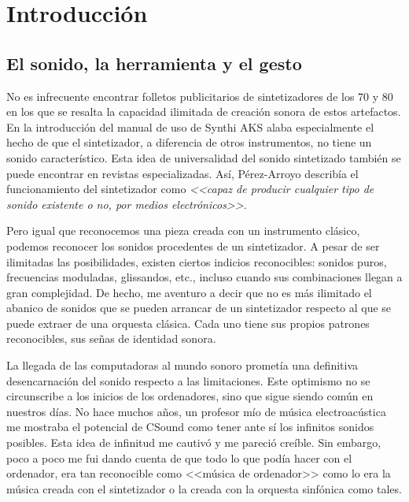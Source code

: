 \chapter[Introducción]{Introducción}


\section{El sonido, la herramienta y el gesto}


No es infrecuente encontrar folletos publicitarios de sintetizadores de los 70 y 80 en los que se resalta la capacidad ilimitada de creación sonora de estos artefactos. En la introducción del manual de uso de Synthi AKS \cite{SynthiAKS_brochure} alaba especialmente el hecho de que el sintetizador, a diferencia de otros instrumentos, no tiene un sonido característico. Esta idea de universalidad del sonido sintetizado también se puede encontrar en revistas especializadas. Así, Pérez-Arroyo describía el funcionamiento del sintetizador como \textit{<<capaz de producir cualquier tipo de sonido existente o no, por medios electrónicos>>}\cite{ritmo_542}. 

Pero igual que reconocemos una pieza creada con un instrumento clásico, podemos reconocer los sonidos procedentes de un sintetizador. A pesar de ser ilimitadas las posibilidades, existen ciertos indicios reconocibles: sonidos puros, frecuencias moduladas, glissandos, etc., incluso cuando sus combinaciones llegan a gran complejidad. De hecho, me aventuro a decir que no es más ilimitado el abanico de sonidos que se pueden arrancar de un sintetizador respecto al que se puede extraer de una orquesta clásica. Cada uno tiene sus propios patrones reconocibles, sus señas de identidad sonora. 

La llegada de las computadoras al mundo sonoro prometía una definitiva desencarnación del sonido respecto a las limitaciones. Este optimismo no se circunscribe a los inicios de los ordenadores, sino que sigue siendo común en nuestros días. No hace muchos años, un profesor mío de música electroacústica me mostraba el potencial de CSound como tener ante sí los infinitos sonidos posibles. Esta idea de infinitud me cautivó y me pareció creíble. Sin embargo, poco a poco me fui dando cuenta de que todo lo que podía hacer con el ordenador, era tan reconocible como <<música de ordenador>> como lo era la música creada con el sintetizador o la creada con la orquesta sinfónica como tales. 

